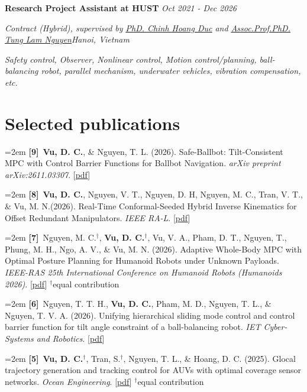 \documentclass[10pt]{extarticle}
\newcommand{\pubitem}[2]{%
	\noindent\hangindent=2em\hangafter=1 \textbf{[#1]}~#2\par\vspace{0.6em}%
}
\let\oldhref\href
\renewcommand{\href}[2]{\oldhref{#1}{\ul{#2}}}
\newcommand{\work}[4]{%
	\noindent \textbf{#1} \hfill \textit{#2}\par
	\vspace{0.3em}
	\noindent \textit{#3}\par
	\vspace{0.3em}
	\noindent \textit{#4}\par
	\normalsize
}
\begin{document}
	\work{Research Project Assistant at HUST}
	{Oct 2021 - Dec 2026}
	{Contract (Hybrid), supervised by \href{https://scholar.google.com/citations?user=mI561CkAAAAJ&hl=en}{\textit{PhD. Chinh Hoang Duc}} and \href{https://scholar.google.com/citations?user=MlJ_2-wAAAAJ&hl=en}{\textit{Assoc.Prof.PhD. Tung Lam Nguyen}}\hfill Hanoi, Vietnam}
	{Safety control, Observer, Nonlinear control, Motion control/planning, ball-balancing robot, parallel mechanism, underwater vehicles, vibration compensation, etc.}
	

	
	\section*{Selected publications}
	
	\pubitem{9}{{\textbf{Vu, D. C.}}, \& Nguyen, T. L. (2026). Safe-Ballbot: Tilt-Consistent MPC with Control Barrier Functions for Ballbot Navigation. \textit{arXiv preprint arXiv:2611.03307}. [\href{https://arxiv.org/abs/2611.03307}{pdf}]}
	
	\pubitem{8}{{\textbf{Vu, D. C.}}, Nguyen, V. T., Nguyen, D. H, Nguyen, M. C., Tran, V. T., \& Vu, M. N.(2026). Real-Time Conformal-Seeded Hybrid Inverse Kinematics for Offset Redundant Manipulators. \textit{IEEE RA-L}. [\href{https://ieeexplore.ieee.org/document/11753961}{pdf}]}
	
	\pubitem{7}{Nguyen, M. C.$^\dagger$, {\textbf{Vu, D. C.}}$^\dagger$, Vu, V. A., Pham, D. T., Nguyen, T., Phung, M. H., Ngo, A. V., \& Vu, M. N. (2026). Adaptive Whole-Body MPC with Optimal Posture Planning for Humanoid Robots under Unknown Payloads. \textit{IEEE-RAS 25th International Conference on Humanoid Robots (Humanoids 2026)}. [\href{https://arxiv.org/abs/2610.12972}{pdf}] \hfill{\footnotesize $^\dagger$equal contribution}}
	
	\pubitem{6}{Nguyen, T. T. H., {\textbf{Vu, D. C.}}, Pham, M. D., Nguyen, T. L., \& Nguyen, T. V. A. (2026). Unifying hierarchical sliding mode control and control barrier function for tilt angle constraint of a ball-balancing robot. \textit{IET Cyber-Systems and Robotics}. [\href{https://doi.org/10.1049/csy2.70045}{pdf}]}

	\pubitem{5}{{\textbf{Vu, D. C.}}$^\dagger$, Tran, S.$^\dagger$, Nguyen, T. L., \& Hoang, D. C. (2025). Glocal trajectory generation and tracking control for AUVs with optimal coverage sensor networks. \textit{Ocean Engineering}. [\href{https://doi.org/10.1016/j.oceaneng.2025.122902}{pdf}] \hfill{\footnotesize $^\dagger$equal contribution}}
\end{document}
